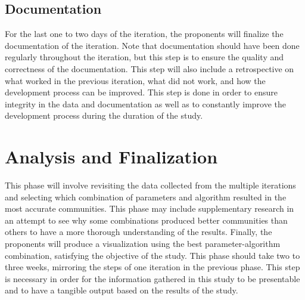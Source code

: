 \subsection{Documentation}

For the last one to two days of the iteration, the proponents will finalize the documentation of the iteration. Note that documentation should have been done regularly throughout the iteration, but this step is to ensure the quality and correctness of the documentation. This step will also include a retrospective on what worked in the previous iteration, what did not work, and how the development process can be improved. This step is done in order to ensure integrity in the data and documentation as well as to constantly improve the development process during the duration of the study.

\section{Analysis and Finalization}

This phase will involve revisiting the data collected from the multiple iterations and selecting which combination of parameters and algorithm resulted in the most accurate communities. This phase may include supplementary research in an attempt to see why some combinations produced better communities than others to have a more thorough understanding of the results. Finally, the proponents will produce a visualization using the best parameter-algorithm combination, satisfying the objective of the study. This phase should take two to three weeks, mirroring the steps of one iteration in the previous phase. This step is necessary in order for the information gathered in this study to be presentable and to have a tangible output based on the results of the study.

